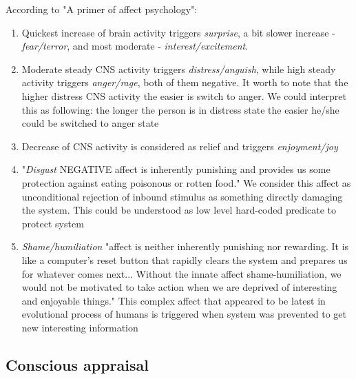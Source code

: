 According to "A primer of affect psychology"\cite{primer_affect_psychology}: 

\begin{enumerate}
 \item Quickest increase of brain activity triggers \emph{surprise}, a bit slower increase - \emph{fear/terror}, and most moderate - \emph{interest/excitement}.
 \item  Moderate steady CNS activity triggers \emph{distress/anguish}, while high steady activity triggers \emph{anger/rage}, both of them negative. It worth to note that the higher distress CNS activity the easier is switch to anger. We could interpret this as following: the longer the person is in distress state the easier he/she could be switched to anger state
 \item  Decrease of CNS activity is considered as relief and triggers \emph{enjoyment/joy}
 \item  "\emph{Disgust} NEGATIVE affect is inherently punishing and provides us some protection against eating poisonous or rotten food." We consider this affect as unconditional rejection of inbound stimulus as something directly damaging the system. This could be understood as low level hard-coded predicate to protect system
 \item  \emph{Shame/humiliation} "affect is neither inherently punishing nor rewarding. It is like a computer’s reset button that rapidly clears the system and prepares us for whatever comes next... Without the innate affect shame-humiliation, we would not be motivated to take action when we are deprived of interesting and enjoyable things." This complex affect that appeared to be latest in evolutional process of humans is triggered when system was prevented to get new interesting information
\end{enumerate}

\subsection{Conscious appraisal}

